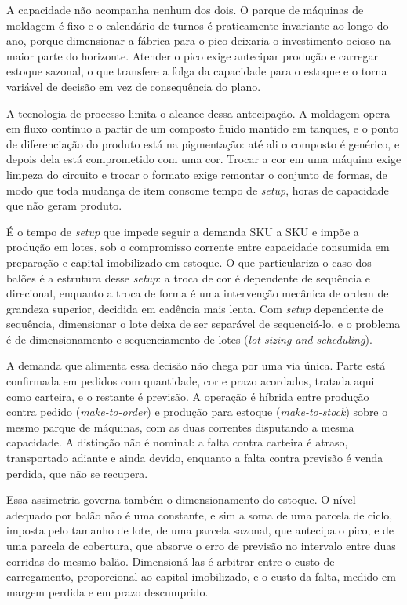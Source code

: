 \documentclass[fleqn,12pt,a4paper]{article}
\begin{document}
A capacidade não acompanha nenhum dos dois. O parque de máquinas de moldagem é fixo e o calendário de turnos é praticamente invariante ao longo do ano, porque dimensionar a fábrica para o pico deixaria o investimento ocioso na maior parte do horizonte. Atender o pico exige antecipar produção e carregar estoque sazonal, o que transfere a folga da capacidade para o estoque e o torna variável de decisão em vez de consequência do plano.

A tecnologia de processo limita o alcance dessa antecipação. A moldagem opera em fluxo contínuo a partir de um composto fluido mantido em tanques, e o ponto de diferenciação do produto está na pigmentação: até ali o composto é genérico, e depois dela está comprometido com uma cor. Trocar a cor em uma máquina exige limpeza do circuito e trocar o formato exige remontar o conjunto de formas, de modo que toda mudança de item consome tempo de \textit{setup}, horas de capacidade que não geram produto.

É o tempo de \textit{setup} que impede seguir a demanda SKU a SKU e impõe a produção em lotes, sob o compromisso corrente entre capacidade consumida em preparação e capital imobilizado em estoque. O que particulariza o caso dos balões é a estrutura desse \textit{setup}: a troca de cor é dependente de sequência e direcional, enquanto a troca de forma é uma intervenção mecânica de ordem de grandeza superior, decidida em cadência mais lenta. Com \textit{setup} dependente de sequência, dimensionar o lote deixa de ser separável de sequenciá-lo, e o problema é de dimensionamento e sequenciamento de lotes (\textit{lot sizing and scheduling}).

A demanda que alimenta essa decisão não chega por uma via única. Parte está confirmada em pedidos com quantidade, cor e prazo acordados, tratada aqui como carteira, e o restante é previsão. A operação é híbrida entre produção contra pedido (\textit{make-to-order}) e produção para estoque (\textit{make-to-stock}) sobre o mesmo parque de máquinas, com as duas correntes disputando a mesma capacidade. A distinção não é nominal: a falta contra carteira é atraso, transportado adiante e ainda devido, enquanto a falta contra previsão é venda perdida, que não se recupera.

Essa assimetria governa também o dimensionamento do estoque. O nível adequado por balão não é uma constante, e sim a soma de uma parcela de ciclo, imposta pelo tamanho de lote, de uma parcela sazonal, que antecipa o pico, e de uma parcela de cobertura, que absorve o erro de previsão no intervalo entre duas corridas do mesmo balão. Dimensioná-las é arbitrar entre o custo de carregamento, proporcional ao capital imobilizado, e o custo da falta, medido em margem perdida e em prazo descumprido.
\end{document}
